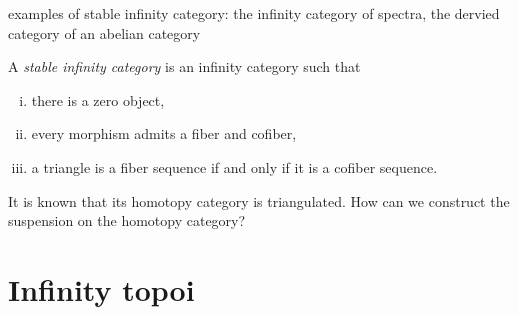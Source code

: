 \documentclass{../../large}
\begin{document}
examples of stable infinity category: the infinity category of spectra, the dervied category of an abelian category

\begin{prb}
A \emph{stable infinity category} is an infinity category such that
\begin{enumerate}[(i)]
\item there is a zero object,
\item every morphism admits a fiber and cofiber,
\item a triangle is a fiber sequence if and only if it is a cofiber sequence.
\end{enumerate}
It is known that its homotopy category is triangulated.
How can we construct the suspension on the homotopy category?
\end{prb}


\begin{prb}
\end{prb}









\chapter{Infinity topoi}
\end{document}
